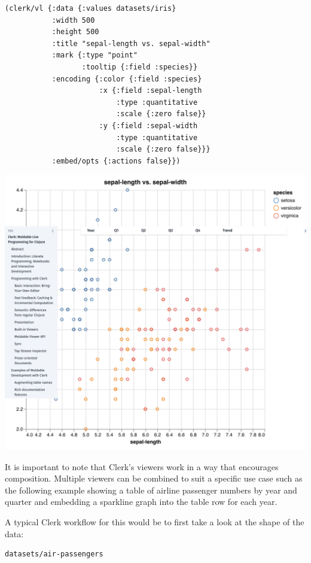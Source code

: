 \documentclass[sigconf,screen]{acmart}
\begin{document}
\begin{lstlisting}
(clerk/vl {:data {:values datasets/iris}
           :width 500
           :height 500
           :title "sepal-length vs. sepal-width"
           :mark {:type "point"
                  :tooltip {:field :species}}
           :encoding {:color {:field :species}
                      :x {:field :sepal-length
                          :type :quantitative
                          :scale {:zero false}}
                      :y {:field :sepal-width
                          :type :quantitative
                          :scale {:zero false}}}
           :embed/opts {:actions false}})
\end{lstlisting}

\includegraphics{images/result-anon-expr-5dtjeGHWCqJb9X8RfQtspB6Cyeo8Yv.png}

It is important to note that Clerk's viewers work in a way that encourages composition. Multiple viewers can be combined to suit a specific use case such as the following example showing a table of airline passenger numbers by year and quarter and embedding a sparkline graph into the table row for each year.

A typical Clerk workflow for this would be to first take a look at the shape of the data:

\begin{lstlisting}
datasets/air-passengers
\end{lstlisting}
\end{document}
